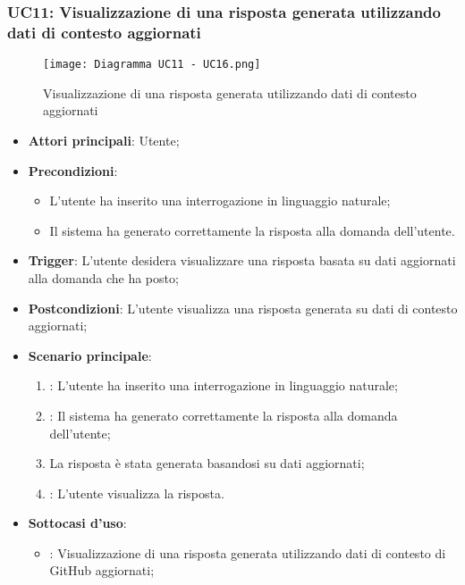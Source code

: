 \newpage
\hypertarget{UC11}{}
\subsubsection{UC11: Visualizzazione di una risposta generata utilizzando dati di contesto aggiornati}

\begin{figure}[h]
    \centering
    \texttt{[image: Diagramma UC11 - UC16.png]}
    \caption{Visualizzazione di una risposta generata utilizzando dati di contesto aggiornati}
\end{figure}

\begin{itemize}
    \item \textbf{Attori principali}: Utente;
    \item \textbf{Precondizioni}: 
    \begin{itemize}
        \item L'utente ha inserito una interrogazione in linguaggio naturale;
        \item Il sistema ha generato correttamente la risposta alla domanda dell'utente.
    \end{itemize}
    \item \textbf{Trigger}: L'utente desidera visualizzare una risposta basata su dati aggiornati alla domanda che ha posto;
    \item \textbf{Postcondizioni}: L'utente visualizza una risposta generata su dati di contesto aggiornati;
    \item \textbf{Scenario principale}:
    \begin{enumerate}
        \item {}: L'utente ha inserito una interrogazione in linguaggio naturale;
        \item {}: Il sistema ha generato correttamente la risposta alla domanda dell'utente;
        \item La risposta è stata generata basandosi su dati aggiornati;
        \item {}: L'utente visualizza la risposta.
    \end{enumerate}
    \item \textbf{Sottocasi d'uso}:
    \begin{itemize}
        \item {}: Visualizzazione di una risposta generata utilizzando dati di contesto di 
        GitHub aggiornati;

\end{itemize}
\end{itemize}
